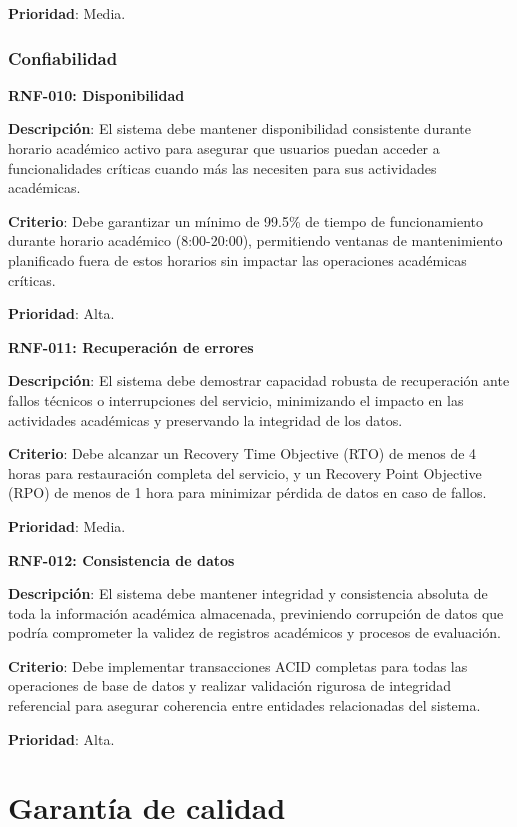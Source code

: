 \documentclass[12pt,a4paper,oneside]{report}
\begin{document}
\textbf{Prioridad}: Media.

\subsubsection{Confiabilidad}\label{confiabilidad}

\textbf{RNF-010: Disponibilidad}

\textbf{Descripción}: El sistema debe mantener disponibilidad consistente durante horario académico activo para asegurar que usuarios puedan acceder a funcionalidades críticas cuando más las necesiten para sus actividades académicas.

\textbf{Criterio}: Debe garantizar un mínimo de 99.5\% de tiempo de funcionamiento durante horario académico (8:00-20:00), permitiendo ventanas de mantenimiento planificado fuera de estos horarios sin impactar las operaciones académicas críticas.

\textbf{Prioridad}: Alta.

\textbf{RNF-011: Recuperación de errores}

\textbf{Descripción}: El sistema debe demostrar capacidad robusta de recuperación ante fallos técnicos o interrupciones del servicio, minimizando el impacto en las actividades académicas y preservando la integridad de los datos.

\textbf{Criterio}: Debe alcanzar un Recovery Time Objective (RTO) de menos de 4 horas para restauración completa del servicio, y un Recovery Point Objective (RPO) de menos de 1 hora para minimizar pérdida de datos en caso de fallos.

\textbf{Prioridad}: Media.

\textbf{RNF-012: Consistencia de datos}

\textbf{Descripción}: El sistema debe mantener integridad y consistencia absoluta de toda la información académica almacenada, previniendo corrupción de datos que podría comprometer la validez de registros académicos y procesos de evaluación.

\textbf{Criterio}: Debe implementar transacciones ACID completas para todas las operaciones de base de datos y realizar validación rigurosa de integridad referencial para asegurar coherencia entre entidades relacionadas del sistema.

\textbf{Prioridad}: Alta.

\section{Garantía de calidad}\label{garantuxeda-de-calidad}
\end{document}
